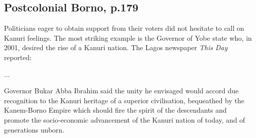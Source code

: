 \documentclass[12pt]{article}
\begin{document}
\subsection{Postcolonial Borno, p.179}

Politicians eager to obtain support from their voters did not hesitate to call
on Kanuri feelings. The most striking example is the Governor of Yobe state
who, in 2001, desired the rise of a Kanuri nation. The Lagos newspaper
\textit{This Day} reported:

...

Governor Bukar Abba Ibrahim said the unity he envisaged would accord due
recognition to the Kanuri heritage of a superior civilisation, bequeathed by the
Kanem-Borno Empire which should fire the spirit of the descendants and promote
the socio-economic advancement of the Kanuri nation of today, and of generations
unborn.

\pagebreak



\end{document}

